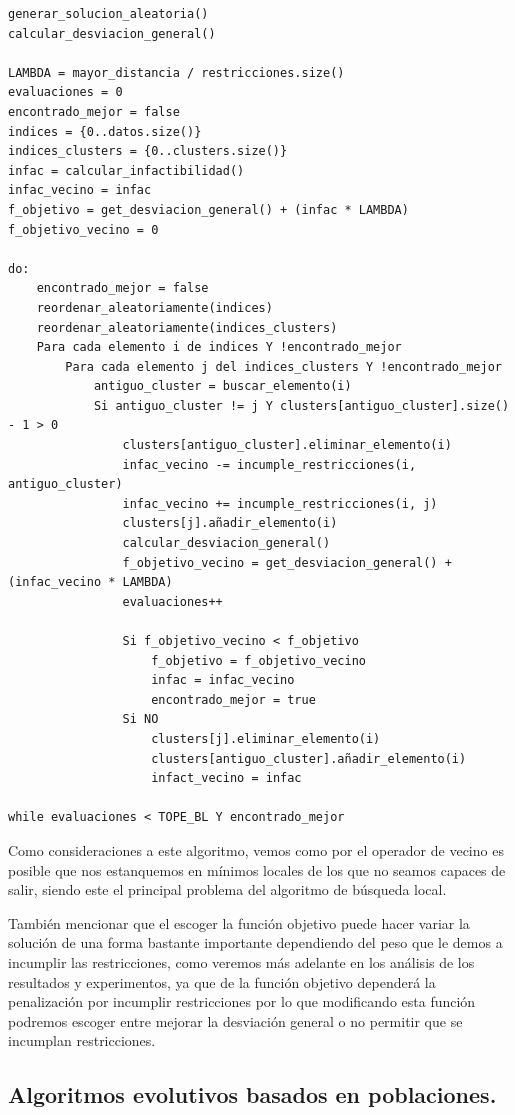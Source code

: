 \documentclass[12pt, spanish]{article}
\begin{document}
{\small
\begin{lstlisting}
generar_solucion_aleatoria()
calcular_desviacion_general()

LAMBDA = mayor_distancia / restricciones.size()
evaluaciones = 0
encontrado_mejor = false
indices = {0..datos.size()}
indices_clusters = {0..clusters.size()}
infac = calcular_infactibilidad()
infac_vecino = infac
f_objetivo = get_desviacion_general() + (infac * LAMBDA)
f_objetivo_vecino = 0

do:
	encontrado_mejor = false
	reordenar_aleatoriamente(indices)
	reordenar_aleatoriamente(indices_clusters)
	Para cada elemento i de indices Y !encontrado_mejor
		Para cada elemento j del indices_clusters Y !encontrado_mejor
			antiguo_cluster = buscar_elemento(i)
			Si antiguo_cluster != j Y clusters[antiguo_cluster].size() - 1 > 0
				clusters[antiguo_cluster].eliminar_elemento(i)
				infac_vecino -= incumple_restricciones(i, antiguo_cluster)
				infac_vecino += incumple_restricciones(i, j)
				clusters[j].añadir_elemento(i)
				calcular_desviacion_general()
				f_objetivo_vecino = get_desviacion_general() + (infac_vecino * LAMBDA)
				evaluaciones++				
				
				Si f_objetivo_vecino < f_objetivo
					f_objetivo = f_objetivo_vecino
					infac = infac_vecino
					encontrado_mejor = true
				Si NO
					clusters[j].eliminar_elemento(i)
					clusters[antiguo_cluster].añadir_elemento(i)
					infact_vecino = infac

while evaluaciones < TOPE_BL Y encontrado_mejor
 \end{lstlisting}
 }
 
 
Como consideraciones a este algoritmo, vemos como por el operador de vecino es posible que nos estanquemos en mínimos locales de los que no seamos capaces de salir, siendo este el principal problema del algoritmo de búsqueda local.

También mencionar que el escoger la función objetivo puede hacer variar la solución de una forma bastante importante dependiendo del peso que le demos a incumplir las restricciones, como veremos más adelante en los análisis de los resultados y experimentos, ya que de la función objetivo dependerá la penalización por incumplir restricciones por lo que modificando esta función podremos escoger entre mejorar la desviación general o no permitir que se incumplan restricciones.

\newpage

\subsection{Algoritmos evolutivos basados en poblaciones.}
\end{document}
